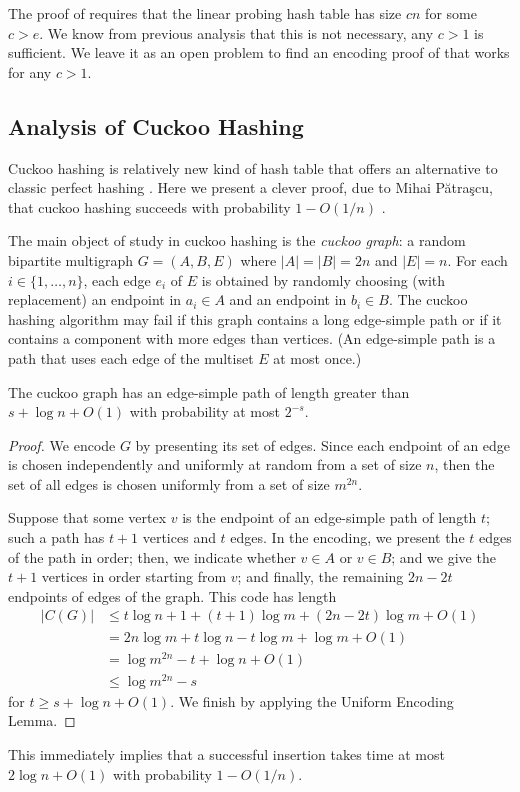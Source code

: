 \documentclass{patmorin}
\begin{document}
\begin{rem}
  The proof of  requires that the linear
  probing hash table has size $cn$ for some $c>e$.  We know from
  previous analysis that this is not necessary, any $c>1$ is
  sufficient. We leave it as an open problem to find an encoding proof
  of  that works for any $c>1$.
\end{rem}

\subsection{Analysis of Cuckoo Hashing}

Cuckoo hashing is relatively new kind of hash table that offers an
alternative to classic perfect hashing \cite{pagh.rodler:cuckoo}. Here
we present a clever proof, due to Mihai Pătraşcu, that cuckoo hashing
succeeds with probability $1-O(1/n)$ \cite{patrascu:cuckoo}.

The main object of study in cuckoo hashing is the \emph{cuckoo graph}:
a random bipartite multigraph $G=(A,B,E)$ where $|A|=|B|=2n$ and
$|E|=n$.  For each $i\in\{1,\ldots,n\}$, each edge $e_i$ of $E$ is
obtained by randomly choosing (with replacement) an endpoint in
$a_i\in A$ and an endpoint in $b_i\in B$.  The cuckoo hashing
algorithm may fail if this graph contains a long edge-simple path or
if it contains a component with more edges than vertices.  (An
edge-simple path is a path that uses each edge of the multiset $E$ at
most once.)

\begin{lem}
  The cuckoo graph has an edge-simple path of length greater than
  $s + \log n + O(1)$ with probability at most $2^{-s}$.
\end{lem}
\begin{proof}
  We encode $G$ by presenting its set of edges. Since each endpoint of
  an edge is chosen independently and uniformly at random from a set
  of size $n$, then the set of all edges is chosen uniformly from a
  set of size $m^{2n}$.

  Suppose that some vertex $v$ is the endpoint of an edge-simple path
  of length $t$; such a path has $t + 1$ vertices and $t$ edges. In
  the encoding, we present the $t$ edges of the path in order; then,
  we indicate whether $v \in A$ or $v \in B$; and we give the $t + 1$
  vertices in order starting from $v$; and finally, the remaining
  $2n - 2t$ endpoints of edges of the graph. This code has length
  \begin{align*}
    |C(G)| &\leq t \log n + 1 + (t + 1) \log m + (2n - 2t) \log m + O(1)\\
           &= 2n \log m + t \log n - t \log m + \log m + O(1) \\
           &= \log m^{2n} - t + \log n + O(1) \\
           &\leq \log m^{2n} - s
  \end{align*}
  for $t \geq s + \log n + O(1)$. We finish by applying the Uniform
  Encoding Lemma.
\end{proof}
This immediately implies that a successful insertion takes time at
most $2 \log n + O(1)$ with probability $1 - O(1/n)$.
\end{document}
